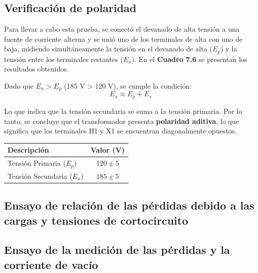 \subsection{Verificación de polaridad}
Para llevar a cabo esta prueba, se conectó el devanado de alta tensión a una fuente de corriente alterna y se unió uno de los terminales de alta con uno de baja, midiendo simultáneamente la tensión en el devanado de alta ($E_p$) y la tensión entre los terminales restantes ($E_x$). En el \textbf{Cuadro 7.6} se presentan los resultados obtenidos.

Dado que $E_x > E_p$ (185 V > 120 V), se cumple la condición:
\begin{equation}
E_x \approx E_p + E_s \tag{7.3}
\end{equation}

Lo que indica que la tensión secundaria se suma a la tensión primaria. Por lo tanto, se concluye que el transformador presenta \textbf{polaridad aditiva}, lo que significa que los terminales H1 y X1 se encuentran diagonalmente opuestos.
\begin{center}
    \renewcommand{\arraystretch}{1.3}
    \begin{tabular}{lc}
    \toprule
    \textbf{Descripción} & \textbf{Valor (V)} \\ 
    \midrule
    Tensión Primaria ($E_p$) & $120 \pm 5$ \\
    Tensión Secundaria ($E_x$) & $185 \pm 5$ \\
    \bottomrule
    \end{tabular}
\end{center}


\subsection{Ensayo de relación de las pérdidas debido a las cargas y tensiones de cortocircuito}

\subsection{Ensayo de la medición de las pérdidas y la corriente de vacío}



